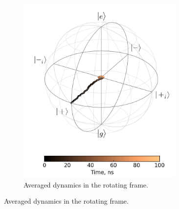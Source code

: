 \documentclass[12pt]{report}
\numberwithin{equation}{section}
\begin{document}
\begin{figure}
\begin{subfigure}[t]{0.45\textwidth}
\includegraphics[width=0.9\textwidth]{cdeph_bloch_rf_avg}
\caption{Averaged dynamics in the rotating frame.}
\end{subfigure}


\end{figure}
\end{document}

